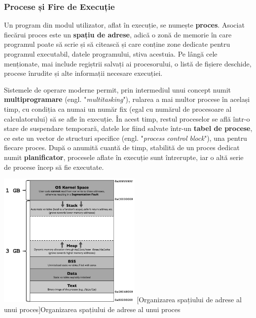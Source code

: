 \documentclass[../../main.tex]{subfiles}
\begin{document}
\subsubsection{Procese și Fire de Execuție}

Un program din modul utilizator, aflat în execuție, se numește \textbf{proces}. Asociat fiecărui proces este un \textbf{spațiu de adrese}, adică o zonă de memorie în care programul poate să scrie și să citească și care conține zone dedicate pentru programul executabil, datele programului, stiva acestuia. Pe lângă cele menționate, mai include regiștrii salvați ai procesorului, o listă de fișiere deschide, procese înrudite și alte informații necesare execuției.

Sistemele de operare moderne permit, prin intermediul unui concept numit \textbf{multiprogramare} (engl. "\textit{multitasking}"), rularea a mai multor procese în același timp, cu condiția ca numai un număr fix (egal cu numărul de procesoare al calculatorului) să se afle în execuție. În acest timp, restul proceselor se află într-o stare de suspendare temporară, datele lor fiind salvate într-un \textbf{tabel de procese}, ce este un vector de structuri specifice (engl. "\textit{process control block}"), una pentru fiecare proces. După o anumită cuantă de timp, stabilită de un proces dedicat numit \textbf{planificator}, procesele aflate în execuție sunt întrerupte, iar o altă serie de procese încep să fie executate.

\begin{center}
    \includegraphics[width=7cm]{components/images/illustrations/memory_layout.png}
    \label{fig:memory_layout}
    \captionsetup{justification=centering,margin=1cm}
    [Organizarea spațiului de adrese al unui proces]{Organizarea spațiului de adrese al unui proces\footnotemark}
\end{center}
\vspace{0.3cm}
\end{document}
